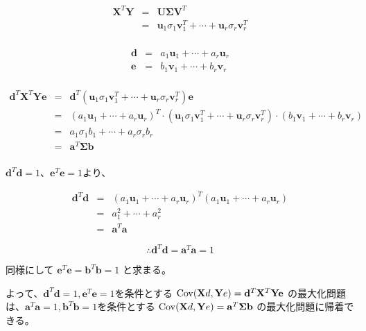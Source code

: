\begin{eqnarray*}
{\mathbf X}^T {\mathbf Y} & = & {\mathbf U}{\mathbf \Sigma}{\mathbf V}^T \\
                          & = & {\mathbf u}_1 \sigma_1 {\mathbf v}_1^T + \cdots + {\mathbf u}_r \sigma_r {\mathbf v}_r^T \\
\end{eqnarray*}

\begin{eqnarray*}
{\mathbf d} & = & a_1 {\mathbf u}_1 + \cdots + a_r {\mathbf u}_r \\
{\mathbf e} & = & b_1 {\mathbf v}_1 + \cdots + b_r {\mathbf v}_r \\
\end{eqnarray*}

\begin{eqnarray*}
{\mathbf d}^T{\mathbf X}^T{\mathbf Y}{\mathbf e} & = & {\mathbf d}^T ( {\mathbf u}_1 \sigma_1 {\mathbf v}_1^T + \cdots + {\mathbf u}_r\sigma_r{\mathbf v}_r^T){\mathbf e} \\
 & = & ( a_1 {\mathbf u}_1 + \cdots + a_r {\mathbf u}_r )^T \cdot ( {\mathbf u}_1 \sigma_1 {\mathbf v}_1^T + \cdots + {\mathbf u}_r\sigma_r{\mathbf v}_r^T) \cdot ( b_1 {\mathbf v}_1 + \cdots + b_r {\mathbf v}_r ) \\
 & = & a_1 \sigma_1 b_1 + \cdots + a_r \sigma_r b_r \\
 & = & {\mathbf a}^T{\mathbf \Sigma}{\mathbf b}\\
\end{eqnarray*}

\({\mathbf d}^T{\mathbf d}=1\)、\({\mathbf e}^T{\mathbf e}=1\)より、

\begin{eqnarray*}
{\mathbf d}^T{\mathbf d} & = & ( a_1 {\mathbf u}_1 + \cdots + a_r {\mathbf u}_r )^T ( a_1 {\mathbf u}_1 + \cdots + a_r {\mathbf u}_r ) \\
 & = & a_1^2 + \cdots + a_r^2\\
 & = & {\mathbf a}^T{\mathbf a}
\end{eqnarray*}

\[\therefore {\mathbf d}^T{\mathbf d} = {\mathbf a}^T{\mathbf a} = 1\]

同様にして \({\mathbf e}^T{\mathbf e} = {\mathbf b}^T{\mathbf b}= 1\) と求まる。

よって、\({\mathbf d}^T{\mathbf d} = 1, {\mathbf e}^T{\mathbf e} = 1\)を条件とする \({\rm Cov}({\mathbf Xd},{\mathbf Ye}) = {\mathbf d}^T{\mathbf X}^T{\mathbf Y}{\mathbf e}\) の最大化問題は、\({\mathbf a}^T{\mathbf a} = 1, {\mathbf b}^T{\mathbf b} = 1\)を条件とする \({\rm Cov}({\mathbf Xd},{\mathbf Ye}) = {\mathbf a}^T{\mathbf \Sigma}{\mathbf b}\) の最大化問題に帰着できる。

